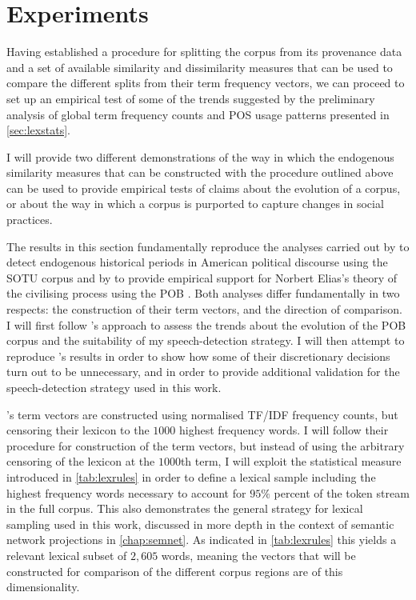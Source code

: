 \section{Experiments}
\label{sec:pob_experiments}

Having established a procedure for splitting the corpus from its provenance data and a set of available similarity and dissimilarity measures that can be used to compare the different splits from their term frequency vectors, we can proceed to set up an empirical test of some of the trends suggested by the preliminary analysis of global term frequency counts and POS usage patterns presented in \autoref{sec:lexstats}.

I will provide two different demonstrations of the way in which the endogenous similarity measures that can be constructed with the procedure outlined above can be used to provide empirical tests of claims about the evolution of a corpus, or about the way in which a corpus is purported to capture changes in social practices.

The results in this section fundamentally reproduce the analyses carried out by \citet{rule2015} to detect endogenous historical periods in American political discourse using the SOTU corpus and by \citet{klingenstein2014} to provide empirical support for Norbert Elias's theory of the civilising process using the POB \citep{elias2000}.
Both analyses differ fundamentally in two respects: the construction of their term vectors, and the direction of comparison.
I will first follow \citeauthor{rule2015}'s approach to assess the trends about the evolution of the POB corpus and the suitability of my speech-detection strategy.
I will then attempt to reproduce \citeauthor{klingenstein2014}'s results in order to show how some of their discretionary decisions turn out to be unnecessary, and in order to provide additional validation for the speech-detection strategy used in this work.

\citeauthor{rule2015}'s term vectors are constructed using normalised TF/IDF frequency counts, but censoring their lexicon to the $1000$ highest frequency words.
I will follow their procedure for construction of the term vectors, but instead of using the arbitrary censoring of the lexicon at the $1000$th term, I will exploit the statistical measure introduced in \autoref{tab:lexrules} in order to define a lexical sample including the highest frequency words necessary to account for $95\%$ percent of the token stream in the full corpus.
This also demonstrates the general strategy for lexical sampling used in this work, discussed in more depth in the context of semantic network projections in \autoref{chap:semnet}.
As indicated in \autoref{tab:lexrules} this yields a relevant lexical subset of $2,605$ words, meaning the vectors that will be constructed for comparison of the different corpus regions are of this dimensionality.

